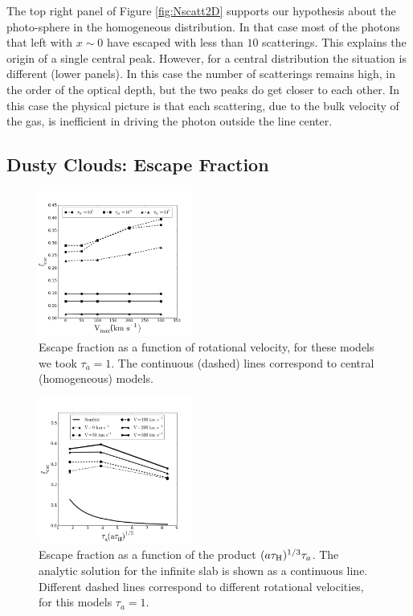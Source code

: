\documentclass{emulateapj}
\begin{document}
The top right panel of Figure \ref{fig:Nscatt2D} supports our hypothesis about
the photo-sphere in the homogeneous distribution. In that case most of
the photons that left with $x\sim 0$ have escaped with less than $10$
scatterings. This explains the origin of a single central
peak. However, for a central distribution the situation is
different (lower panels). In this case the number of scatterings remains high, in the
order of the optical depth, but the two peaks do get closer to each
other. In this case the physical picture is that each scattering, due
to the bulk velocity of the gas, is inefficient in driving the photon
outside the line center. 


\subsection{Dusty Clouds: Escape Fraction}
\label{sec:escapefraction}


\begin{figure}
  \includegraphics[width=0.45\textwidth]{escapefraction.png}
   \caption{Escape fraction as a function of rotational velocity, for these models we took $\tau_{a}=1$. The
     continuous (dashed) lines correspond to central (homogeneous)
     models.
     \label{fig:efvsv}}
\end{figure}


\begin{figure}
  \includegraphics[width=0.45\textwidth]{Neufeld.png}
 \caption{Escape fraction as a function of the
   product $(a\tau_{\rm H})^{1/3}\tau_{a}$. The analytic solution for
   the infinite slab is shown as a continuous line. Different dashed
   lines correspond to different rotational velocities, for this models 
   $\tau_a = 1$.
   \label{fig:efvsNeufeld}}   
\end{figure}
\end{document}

